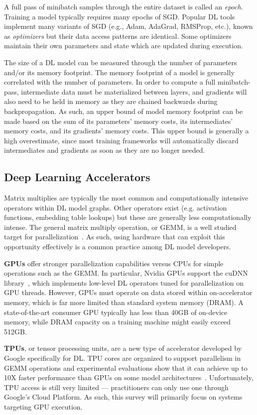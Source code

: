 A full pass of minibatch samples through the entire dataset is called an \textit{epoch}. Training a model typically requires many epochs of SGD. Popular DL tools implement many variants of SGD (e.g., Adam, AdaGrad, RMSProp, etc.), known as \textit{optimizers} but their data access patterns are identical. Some optimizers maintain their own parameters and state which are updated during execution.

The size of a DL model can be measured through the number of parameters and/or its memory footprint. The memory footprint of a model is generally correlated with the number of parameters. In order to compute a full minibatch-pass, intermediate data must be materialized between layers, and gradients will also need to be held in memory as they are chained backwards during backpropagation. As such, an upper bound of model memory footprint can be made based on the sum of its parameters' memory costs, its intermediates' memory costs, and its gradients' memory costs. This upper bound is generally a high overestimate, since most training frameworks will automatically discard intermediates and gradients as soon as they are no longer needed.

\subsection{Deep Learning Accelerators}
Matrix multiplies are typically the most common and computationally intensive operators within DL model graphs. Other operators exist (e.g. activation functions, embedding table lookups) but these are generally less computationally intense. The general matrix multiply operation, or GEMM, is a well studied target for parallelization~\cite{blislab2016}. As such, using hardware that can exploit this opportunity effectively is a common practice among DL model developers.

\textbf{GPUs} offer stronger parallelization capabilities versus CPUs for simple operations such as the GEMM. In particular, Nvidia GPUs support the cuDNN library~\cite{cudnn}, which implements low-level DL operators tuned for parallelization on GPU threads. However, GPUs must operate on data stored within on-accelerator memory, which is far more limited than standard system memory (DRAM). A state-of-the-art consumer GPU typically has less than 40GB of on-device memory, while DRAM capacity on a training machine might easily exceed 512GB. 

\textbf{TPUs}, or tensor processing units, are a new type of accelerator developed by Google specifically for DL. TPU cores are organized to support parallelism in GEMM operations and experimental evaluations show that it can achieve up to 10X faster performance than GPUs on some model architectures~\cite{tpubenchmark2019}. Unfortunately, TPU access is still very limited --- practitioners can only use one through Google's Cloud Platform. As such, this survey will primarily focus on systems targeting GPU execution.

